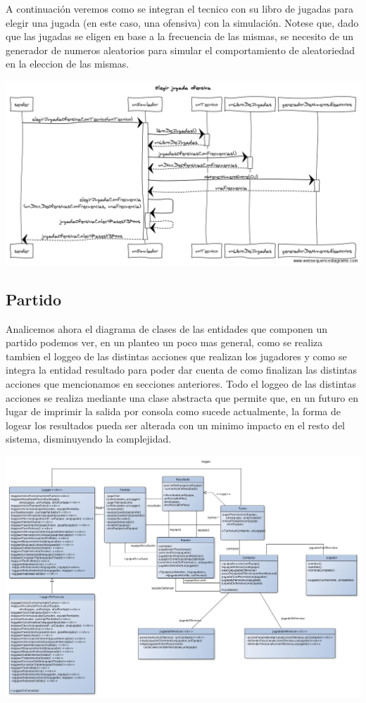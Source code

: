 A continuación veremos como se integran el tecnico con su libro de jugadas para elegir una jugada (en este caso, una ofensiva) con la simulación. Notese que, dado que las jugadas se eligen en base a la frecuencia de las mismas, se necesito de un generador de numeros aleatorios para simular el comportamiento de aleatoriedad en la eleccion de las mismas.
\begin{center}
\includegraphics[scale=0.30]{diseno/Elegir_jugada_ofensiva.png} 
\end{center}


\subsection{Partido}
Analicemos ahora el diagrama de clases de las entidades que componen un partido podemos ver, en un planteo un poco mas general, como se realiza tambien el loggeo de las distintas acciones que realizan los jugadores y como se integra la entidad resultado para poder dar cuenta de como finalizan las distintas acciones que mencionamos en secciones anteriores. Todo el loggeo de las distintas acciones se realiza mediante una clase abstracta que permite que, en un futuro en lugar de imprimir la salida por consola como sucede actualmente, la forma de logear los resultados pueda ser alterada con un minimo impacto en el resto del sistema, disminuyendo la complejidad.
\begin{center}
\includegraphics[scale=0.4, angle=90]{diseno/partido.jpg}
\end{center}

